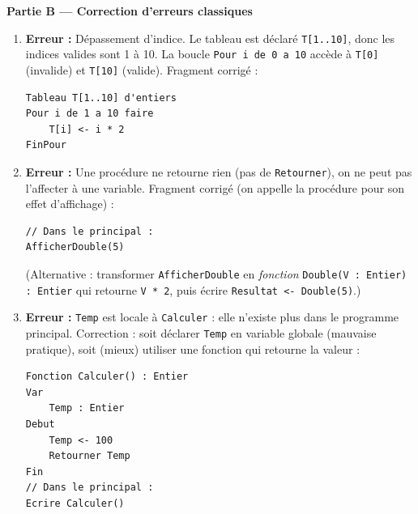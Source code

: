 \documentclass[11pt]{article}
\begin{document}
\begin{corrige}
\textbf{Partie B — Correction d'erreurs classiques}
\begin{enumerate}
    \item \textbf{Erreur :} Dépassement d'indice. Le tableau est déclaré \texttt{T[1..10]}, donc les indices valides sont 1 à 10. La boucle \texttt{Pour i de 0 a 10} accède à \texttt{T[0]} (invalide) et \texttt{T[10]} (valide). Fragment corrigé :
\begin{lstlisting}
Tableau T[1..10] d'entiers
Pour i de 1 a 10 faire
    T[i] <- i * 2
FinPour
\end{lstlisting}
    \item \textbf{Erreur :} Une procédure ne retourne rien (pas de \texttt{Retourner}), on ne peut pas l'affecter à une variable. Fragment corrigé (on appelle la procédure pour son effet d'affichage) :
\begin{lstlisting}
// Dans le principal :
AfficherDouble(5)
\end{lstlisting}
    (Alternative : transformer \texttt{AfficherDouble} en \emph{fonction} \texttt{Double(V : Entier) : Entier} qui retourne \texttt{V * 2}, puis écrire \texttt{Resultat <- Double(5)}.)
    \item \textbf{Erreur :} \texttt{Temp} est locale à \texttt{Calculer} : elle n'existe plus dans le programme principal. Correction : soit déclarer \texttt{Temp} en variable globale (mauvaise pratique), soit (mieux) utiliser une fonction qui retourne la valeur :
\begin{lstlisting}
Fonction Calculer() : Entier
Var
    Temp : Entier
Debut
    Temp <- 100
    Retourner Temp
Fin
// Dans le principal :
Ecrire Calculer()
\end{lstlisting}
\end{enumerate}


\end{corrige}
\end{document}
